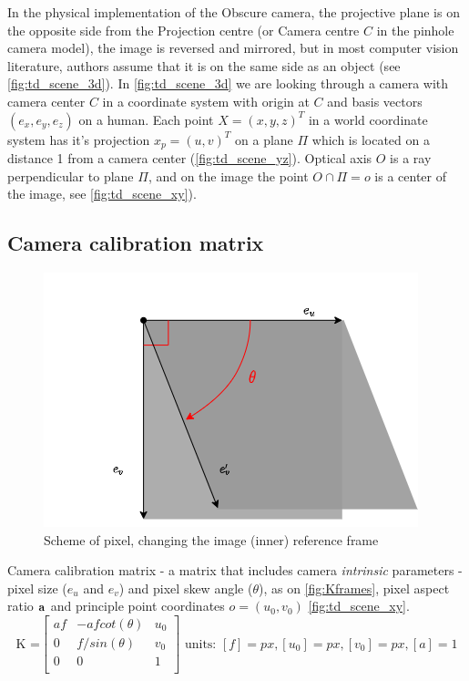 In the physical implementation of the Obscure camera, the projective plane is on the opposite side from the Projection centre (or Camera centre $C$ in the pinhole camera model), the image is reversed and mirrored, but in most computer vision literature, authors assume that it is on the same side as an object (see \autoref{fig:td_scene_3d}).
In \autoref{fig:td_scene_3d} we are looking through a camera with camera center $C$ in a coordinate system with origin at $C$ and basis vectors $(e_x, e_y, e_z)$ on a human. 
Each point $X = (x, y, z)^T$ in a world coordinate system has it's projection $x_p = (u, v)^T$ on a plane $\Pi$ which is located on a distance 1 from a camera center (\autoref{fig:td_scene_yz}). 
Optical axis $O$ is a ray perpendicular to plane $\Pi$, and on the image the point $ O \cap \Pi = o$ is a center of the image, see \autoref{fig:td_scene_xy}).

\subsection{Camera calibration matrix}
\begin{figure}[h]
    \centering
    \includegraphics[width=.6\textwidth]{graphics/pixel.png}
    \caption{Scheme of pixel, changing the image (inner) reference frame}
    \label{fig:Kframes}
\end{figure}
Camera calibration matrix - a matrix that includes camera \textit{intrinsic} parameters - pixel size ($e_u$ and $e_v$) and pixel skew angle ($\theta$), as on \autoref{fig:Kframes}, pixel aspect ratio $\bf{a}$ and principle point coordinates $o = (u_0, v_0)$ \autoref{fig:td_scene_xy}.
\begin{equation}
    \textrm{K =}\begin{bmatrix}
        af & -a f cot(\theta) & u_0 \\
        0 & f / sin(\theta) & v_0 \\
        0 & 0 & 1 \\
    \end{bmatrix} 
    \textrm{ units: } [f]=px, [u_0]=px, [v_0]=px, [a]=1
\end{equation}


